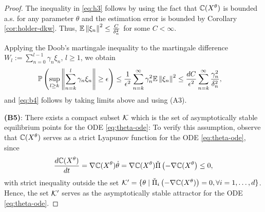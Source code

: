 \begin{proof}
The inequality in \eqref{eq:h3} follows by using the fact that
$\mathbb{C}(X^\theta)$ is bounded a.s. for any parameter $\theta$ and the estimation error  is bounded by Corollary \ref{cor:holder-dkw}.
Thus, $\mathbb{E}\left\| \xi_n\right\|^2 \le \frac{C}{\delta_n^2}$ for some $C<\infty$. 

Applying the Doob's martingale inequality to the martingale difference $W_l := \sum_{n=0}^{l-1} \gamma_n \xi_n$, $l\ge 1$, we obtain
\begin{align*}
&\mathbb{P}\left(  \sup_{l\geq k}   \left\|\sum_{n=k}^{l} \gamma_n \xi_n\right\| \geq \epsilon  \right) 
\le \frac{1}{\epsilon^2} \sum_{n=k}^{\infty} \gamma_n^2 \mathbb{E}\left\| \xi_n\right\|^2 \le \dfrac{d C}{\epsilon^2}  \sum_{n=k}^{\infty}  \frac{\gamma_n^2}{\delta_n^2},
\end{align*}
and \eqref{eq:b4} follows by taking limits above and using  (A3).

\noindent\textbf{(B5)}: There exists a compact subset $\mathcal{K}$ which is the set of asymptotically stable equilibrium points for the  ODE \eqref{eq:theta-ode}: To verify this assumption, observe that $\mathbb{C}(X^{\theta})$ serves as a strict Lyapunov function for the ODE \eqref{eq:theta-ode}, since
$$ \dfrac{d \mathbb{C}(X^{\theta})}{dt} = \nabla \mathbb{C}(X^{\theta}) \dot \theta = \nabla \mathbb{C}(X^{\theta}) \check\Pi \left(-\nabla \mathbb{C}(X^{\theta}\right) \le 0,$$
with strict inequality outside the set $\mathcal{K}' = \{\theta \mid \check\Pi_{i} \left(-\nabla \mathbb{C}(X^{\theta})\right)=0, \forall i=1,\ldots,d\}$. Hence, the set $\mathcal{K}'$ serves as the asymptotically stable attractor for the ODE \eqref{eq:theta-ode}.


\end{proof}
